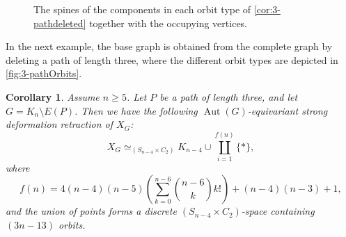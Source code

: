 \documentclass[reqno,dvipsnames]{amsart}
\theoremstyle{plain}
\newtheorem{corollary}[theorem]{Corollary}
\numberwithin{equation}{section}
\theoremstyle{definition}
\DeclareMathOperator{\Aut}{Aut}
\begin{document}
\begin{figure}[tbp]
	\vspace{-3mm}
	\caption{The spines of the components in each orbit type of \autoref{cor:3-pathdeleted} together with the occupying vertices.}
	\label{fig:3-pathOrbits}
\end{figure}

In the next example, the base graph is obtained from the complete graph by deleting a path of length three, where the different orbit types are depicted in \autoref{fig:3-pathOrbits}.

\begin{corollary}\label{cor:3-pathdeleted}
	Assume $n\geq 5$. Let $P$ be a path of length three, and let $G=K_n\setminus E(P)$. Then we have the following $\Aut(G)$-equivariant strong deformation retraction of $X_G$:
	\begin{equation*}
		X_G \simeq_{(S_{n-4}\times C_2)} K_{n-4} \cup \coprod\limits_{i=1}^{f(n)} \{\ast\},
	\end{equation*}
	where
	\begin{equation*}
		f(n)=4(n-4)(n-5)\left( \sum\limits_{k=0}^{n-6} \binom{n-6}{k}k! \right) + (n-4)(n-3) +1,
	\end{equation*}
	and the union of points forms a discrete $(S_{n-4}\times C_2)$-space containing $(3n-13)$ orbits.
\end{corollary}
\end{document}
